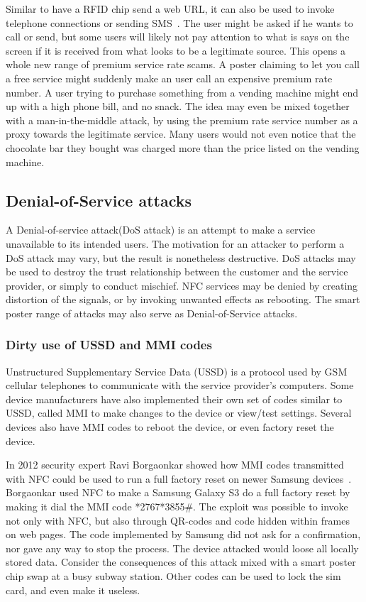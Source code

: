 \documentclass[a4paper,11pt]{article}
\begin{document}
Similar to have a RFID chip send a web URL, it can also be used to invoke telephone connections or sending SMS~\cite{mulliner2009vulnerability}. The user might be asked if he wants to call or send, but some users will likely not pay attention to what is says on the screen if it is received from what looks to be a legitimate source. This opens a whole new range of premium service rate scams. A poster claiming to let you call a free service might suddenly make an user call an expensive premium rate number. A user trying to purchase something from a vending machine might end up with a high phone bill, and no snack. The idea may even be mixed together with a man-in-the-middle attack, by using the premium rate service number as a proxy towards the legitimate service. Many users would not even notice that the chocolate bar they bought was charged more than the price listed on the vending machine.


\subsection{Denial-of-Service attacks}
A Denial-of-service attack(DoS attack) is an attempt to make a service unavailable to its intended users. The motivation for an attacker to perform a DoS attack may vary, but the result is nonetheless destructive. DoS attacks may be used to destroy the trust relationship between the customer and the service provider, or simply to conduct mischief. NFC services may be denied by creating distortion of the signals, or by invoking unwanted effects as rebooting. The smart poster range of attacks may also serve as Denial-of-Service attacks.

\subsubsection{Dirty use of USSD and MMI codes}
Unstructured Supplementary Service Data (USSD) is a protocol used by GSM cellular telephones to communicate with the service provider's computers. Some device manufacturers have also implemented their own set of codes similar to USSD, called MMI to make changes to the device or view/test settings. Several devices also have MMI codes to reboot the device, or even factory reset the device.

In 2012 security expert Ravi Borgaonkar showed how MMI codes transmitted with NFC could be used to run a full factory reset on newer Samsung devices~\cite{USSD}. Borgaonkar used NFC to make a Samsung Galaxy S3 do a full factory reset by making it dial the MMI code *2767*3855\#. The exploit was possible to invoke not only with NFC, but also through QR-codes and code hidden within frames on web pages. The code implemented by Samsung did not ask for a confirmation, nor gave any way to stop the process. The device attacked would loose all locally stored data. Consider the consequences of this attack mixed with a smart poster chip swap at a busy subway station. Other codes can be used to lock the sim card, and even make it useless.
\end{document}
